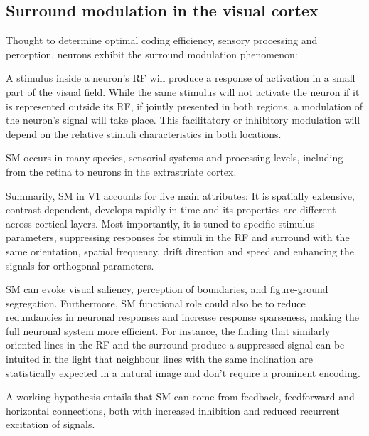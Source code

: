 

\vspace{-0.2cm}

\subsection{Surround modulation in the visual cortex}

Thought to determine optimal coding efficiency, sensory processing and perception, neurons exhibit the surround modulation phenomenon: 

A stimulus inside a neuron's RF will produce a response of activation in a small part of the visual field. While the same stimulus will not activate the neuron if it is represented outside its RF, if jointly presented in both regions, a modulation of the neuron's signal will take place. This facilitatory or inhibitory modulation will depend on the relative stimuli characteristics in both locations. 

SM occurs in many species, sensorial systems and processing levels, including from the retina to neurons in the extrastriate cortex. 

Summarily, SM in V1 accounts for five main attributes: It is spatially extensive, contrast dependent, develops rapidly in time and its properties are different across cortical layers. Most importantly, it is tuned to specific stimulus parameters, suppressing responses for stimuli in the RF and surround with the same orientation, spatial frequency, drift direction and speed and enhancing the signals for orthogonal parameters.

SM can evoke visual saliency, perception of boundaries, and figure-ground segregation. Furthermore, SM functional role could also be to reduce redundancies in neuronal responses and increase response sparseness, making the full neuronal system more efficient. For instance, the finding that similarly oriented lines in the RF and the surround produce a suppressed signal can be intuited in the light that neighbour lines with the same inclination are statistically expected in a natural image and don't require a prominent encoding.

A working hypothesis \cite{SM} entails that SM can come from feedback, feedforward and horizontal connections, both with increased inhibition and reduced recurrent excitation of signals. 


